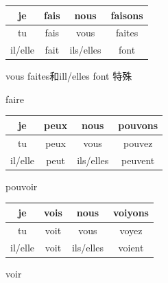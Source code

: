 \documentclass{article}[20pt]{}
\begin{document}
\begin{figure}[ht]
	\centering
		\begin{tabular}{|cc|cc|}\hline
		je & fais &nous & faisons \\ \hline
		tu & fais &vous &faites \\ \hline
		il/elle & fait &ils/elles & font\\ \hline
		\end{tabular}
	\begin{mtips}
		vous faites和ill/elles font 特殊
	\end{mtips}
	\caption{faire}	
\end{figure}
\begin{figure}[ht]
\centering
	\begin{tabular}{|cc|cc|}\hline
		je & peux & nous & pouvons \\ \hline
		tu & peux & vous & pouvez \\ \hline 
		il/elle & peut	&ils/elles & peuvent \\ \hline
	\end{tabular}
	\caption{pouvoir}
\end{figure}
\begin{figure}[htbp]
	\centering
	\begin{tabular}{|cc|cc|}\hline
		je & vois &nous & voiyons \\ \hline
		tu & voit &vous &voyez \\ \hline
		il/elle & voit &ils/elles & voient	\\ \hline			
		\end{tabular}
	\caption{voir}	
\end{figure}
\end{document}

